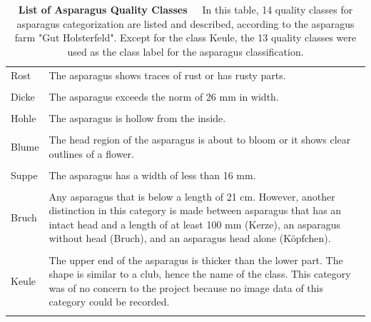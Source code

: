 \begin{table}[H]
\begin{tabular}{l p{11cm}}
		Rost & The asparagus shows traces of rust or has rusty parts. \\
		\\
		Dicke & The asparagus exceeds the norm of 26 mm in width. \\
		\\
		Hohle & The asparagus is hollow from the inside. \\
		\\
		Blume & The head region of the asparagus is about to bloom or it shows clear 					outlines of a flower. \\
		\\
		Suppe & The asparagus has a width of less than 16 mm. \\
		\\
		Bruch & Any asparagus that is below a length of 21 cm. However, another 						distinction in this category is made between asparagus that has an intact head and 		a length of at least 100 mm (Kerze),  an asparagus without head (Bruch), and an 				asparagus head alone (Köpfchen). \\
		\\
		Keule & The upper end of the asparagus is thicker than the lower part. The shape 				is similar to a club, hence the name of the class. This category was of no concern 		to the project because no image data of this category could be recorded. \\
		\\
		\hline
	\end{tabular}
	\caption[List of Asparagus Quality Classes]{\textbf{List of Asparagus Quality Classes}~~~In this table, 14 quality classes for asparagus categorization are listed and described, according to the asparagus farm "Gut Holsterfeld". Except for the class Keule, the 13 quality classes were used as the class label for the asparagus classification.}
	\label{tab:AsparagusLabels}
\end{table}


